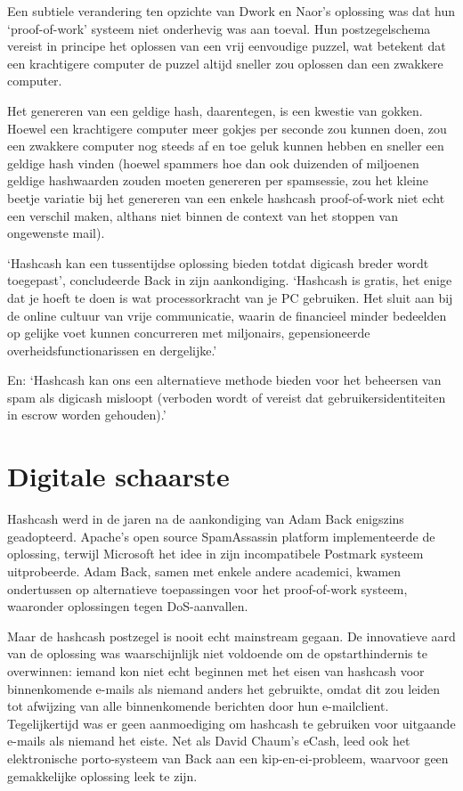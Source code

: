 \documentclass[
  a5paper,
  smalldemyvopaper,11pt,twoside,onecolumn,openright,extrafontsizes]{memoir}
\begin{document}
Een subtiele verandering ten opzichte van Dwork en Naor's oplossing was
dat hun `proof-of-work' systeem niet onderhevig was aan toeval. Hun
postzegelschema vereist in principe het oplossen van een vrij eenvoudige
puzzel, wat betekent dat een krachtigere computer de puzzel altijd
sneller zou oplossen dan een zwakkere computer.

Het genereren van een geldige hash, daarentegen, is een kwestie van
gokken. Hoewel een krachtigere computer meer gokjes per seconde zou
kunnen doen, zou een zwakkere computer nog steeds af en toe geluk kunnen
hebben en sneller een geldige hash vinden (hoewel spammers hoe dan ook
duizenden of miljoenen geldige hashwaarden zouden moeten genereren per
spamsessie, zou het kleine beetje variatie bij het genereren van een
enkele hashcash proof-of-work niet echt een verschil maken, althans niet
binnen de context van het stoppen van ongewenste mail).

`Hashcash kan een tussentijdse oplossing bieden totdat digicash breder
wordt toegepast', concludeerde Back in zijn aankondiging. `Hashcash is
gratis, het enige dat je hoeft te doen is wat processorkracht van je PC
gebruiken. Het sluit aan bij de online cultuur van vrije communicatie,
waarin de financieel minder bedeelden op gelijke voet kunnen concurreren
met miljonairs, gepensioneerde overheidsfunctionarissen en dergelijke.'

En: `Hashcash kan ons een alternatieve methode bieden voor het beheersen
van spam als digicash misloopt (verboden wordt of vereist dat
gebruikersidentiteiten in escrow worden gehouden).'

\section{Digitale schaarste}\label{digitale-schaarste}

Hashcash werd in de jaren na de aankondiging van Adam Back enigszins
geadopteerd. Apache's open source SpamAssassin platform implementeerde
de oplossing, terwijl Microsoft het idee in zijn incompatibele Postmark
systeem uitprobeerde. Adam Back, samen met enkele andere academici,
kwamen ondertussen op alternatieve toepassingen voor het proof-of-work
systeem, waaronder oplossingen tegen DoS-aanvallen.

Maar de hashcash postzegel is nooit echt mainstream gegaan. De
innovatieve aard van de oplossing was waarschijnlijk niet voldoende om
de opstarthindernis te overwinnen: iemand kon niet echt beginnen met het
eisen van hashcash voor binnenkomende e-mails als niemand anders het
gebruikte, omdat dit zou leiden tot afwijzing van alle binnenkomende
berichten door hun e-mailclient. Tegelijkertijd was er geen aanmoediging
om hashcash te gebruiken voor uitgaande e-mails als niemand het eiste.
Net als David Chaum's eCash, leed ook het elektronische porto-systeem
van Back aan een kip-en-ei-probleem, waarvoor geen gemakkelijke
oplossing leek te zijn.
\end{document}
